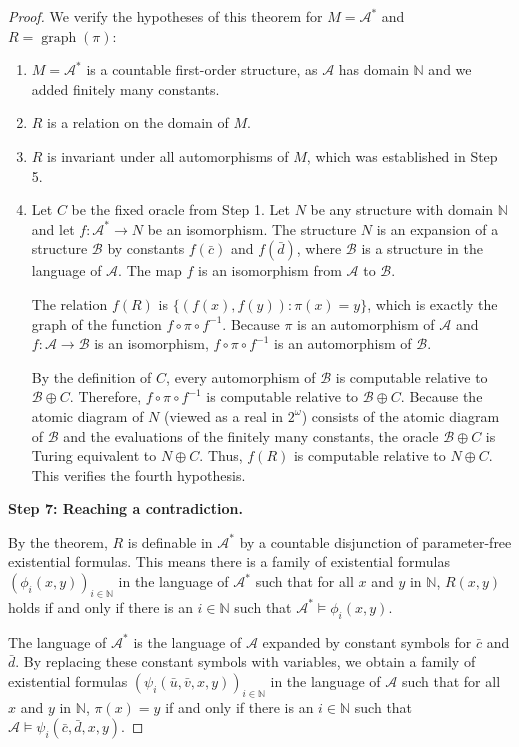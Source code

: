 \documentclass[12pt]{article}
\begin{document}
\begin{proof}
We verify the hypotheses of this theorem for $M = \mathcal{A}^*$ and $R = \operatorname{graph}(\pi)$:
\begin{enumerate}
\item $M = \mathcal{A}^*$ is a countable first-order structure, as $\mathcal{A}$ has domain $\mathbb{N}$ and we added finitely many constants.
\item $R$ is a relation on the domain of $M$.
\item $R$ is invariant under all automorphisms of $M$, which was established in Step 5.
\item Let $C$ be the fixed oracle from Step 1. Let $N$ be any structure with domain $\mathbb{N}$ and let $f: \mathcal{A}^* \to N$ be an isomorphism. The structure $N$ is an expansion of a structure $\mathcal{B}$ by constants $f(\bar{c})$ and $f(\bar{d})$, where $\mathcal{B}$ is a structure in the language of $\mathcal{A}$. The map $f$ is an isomorphism from $\mathcal{A}$ to $\mathcal{B}$. 

The relation $f(R)$ is $\{ (f(x), f(y)) : \pi(x) = y \}$, which is exactly the graph of the function $f \circ \pi \circ f^{-1}$. Because $\pi$ is an automorphism of $\mathcal{A}$ and $f: \mathcal{A} \to \mathcal{B}$ is an isomorphism, $f \circ \pi \circ f^{-1}$ is an automorphism of $\mathcal{B}$. 

By the definition of $C$, every automorphism of $\mathcal{B}$ is computable relative to $\mathcal{B} \oplus C$. Therefore, $f \circ \pi \circ f^{-1}$ is computable relative to $\mathcal{B} \oplus C$. Because the atomic diagram of $N$ (viewed as a real in $2^\omega$) consists of the atomic diagram of $\mathcal{B}$ and the evaluations of the finitely many constants, the oracle $\mathcal{B} \oplus C$ is Turing equivalent to $N \oplus C$. Thus, $f(R)$ is computable relative to $N \oplus C$. This verifies the fourth hypothesis.
\end{enumerate}

\textbf{Step 7: Reaching a contradiction.}

By the theorem, $R$ is definable in $\mathcal{A}^*$ by a countable disjunction of parameter-free existential formulas. This means there is a family of existential formulas $(\phi_i(x,y))_{i \in \mathbb{N}}$ in the language of $\mathcal{A}^*$ such that for all $x$ and $y$ in $\mathbb{N}$, $R(x, y)$ holds if and only if there is an $i \in \mathbb{N}$ such that $\mathcal{A}^* \models \phi_i(x, y)$.

The language of $\mathcal{A}^*$ is the language of $\mathcal{A}$ expanded by constant symbols for $\bar{c}$ and $\bar{d}$. By replacing these constant symbols with variables, we obtain a family of existential formulas $(\psi_i(\bar{u}, \bar{v}, x, y))_{i \in \mathbb{N}}$ in the language of $\mathcal{A}$ such that for all $x$ and $y$ in $\mathbb{N}$, $\pi(x) = y$ if and only if there is an $i \in \mathbb{N}$ such that $\mathcal{A} \models \psi_i(\bar{c}, \bar{d}, x, y)$.


\end{proof}
\end{document}
